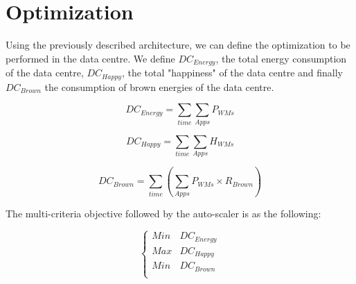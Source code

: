 \section{Optimization}
\label{sec:optim}

Using the previously described architecture, we can define the optimization to be performed in the data centre. 
We define $DC_{Energy}$, the total energy consumption of the data centre, $DC_{Happy}$, the total "happiness" of the data centre and finally $DC_{Brown}$ the consumption of brown energies of the data centre.

\begin{equation}
DC_{Energy} =\sum_{time} \sum_{Apps} P_{WMs}
\label{eq:DCen}
\end{equation}

\begin{equation}
DC_{Happy} =\sum_{time} \sum_{Apps} H_{WMs}
\label{eq:DChappy}
\end{equation}

\begin{equation}
DC_{Brown} =\sum_{time} (\sum_{Apps} P_{WMs} \times R_{Brown})
\label{eq:DCbrown}
\end{equation}

The multi-criteria objective followed by the auto-scaler is as the following:

\begin{equation}
\left\{
  \begin{array}{rcr}
    Min & DC_{Energy} \\
    Max & DC_{Happy}  \\
    Min & DC_{Brown}  \\
  \end{array}
\right.
\label{eq:DCbrown}
\end{equation}
